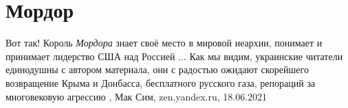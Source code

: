  
 
 
 
 
\chapter{Мордор}

Вот так! Король \emph{Мордора} знает своё место в мировой иеархии, понимает и
принимает лидерство США над Россией ... Как мы видим, украинские читатели
единодушны с автором материала, они с радостью ожидают скорейшего возвращение
Крыма и Донбасса, бесплатного русского газа, репораций за многовековую агрессию
, 
Мак Сим, zen.yandex.ru, 18.06.2021

